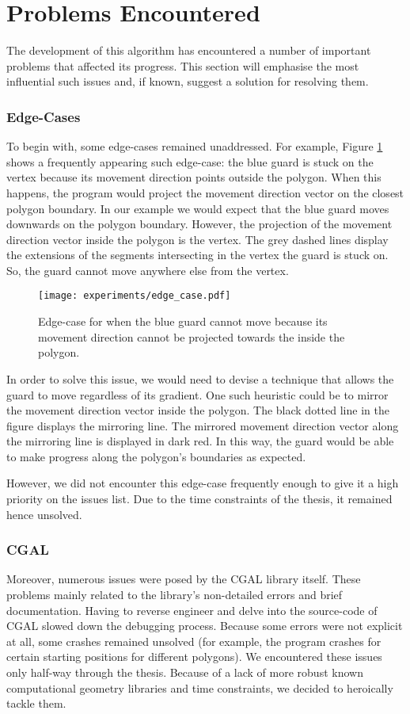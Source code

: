 \section{Problems Encountered}
\label{sec:problems}
The development of this algorithm has encountered a number of important problems that affected its progress. This section will emphasise the most influential such issues and, if known, suggest a solution for resolving them.

\subsubsection*{Edge-Cases}
To begin with, some edge-cases remained unaddressed. For example, Figure \ref{fig:edge} shows a frequently appearing such edge-case: the blue guard is stuck on the vertex because its movement direction points outside the polygon.
When this happens, the program would project the movement direction vector on the closest polygon boundary. In our example we would expect that the blue guard moves downwards on the polygon boundary. However, the projection of the movement direction vector inside the polygon is the vertex. The grey dashed lines display the extensions of the segments intersecting in the vertex the guard is stuck on. So, the guard cannot move anywhere else from the vertex.

\begin{figure}[h!]
    \centering
    \texttt{[image: experiments/edge\_case.pdf]}
    \caption{Edge-case for when the blue guard cannot move because its movement direction cannot be projected towards the inside the polygon.}
    \label{fig:edge}
\end{figure}

In order to solve this issue, we would need to devise a technique that allows the guard to move regardless of its gradient. One such heuristic could be to mirror the movement direction vector inside the polygon. The black dotted line in the figure displays the mirroring line. The mirrored movement direction vector along the mirroring line is displayed in dark red. In this way, the guard would be able to make progress along the polygon's boundaries as expected.

However, we did not encounter this edge-case frequently enough to give it a high priority on the issues list. Due to the time constraints of the thesis, it remained hence unsolved.

\subsubsection*{CGAL}
Moreover, numerous issues were posed by the CGAL library itself. These problems mainly related to the library's non-detailed errors and brief documentation. Having to reverse engineer and delve into the source-code of CGAL slowed down the debugging process. Because some errors were not explicit at all, some crashes remained unsolved (for example, the program crashes for certain starting positions for different polygons). We encountered these issues only half-way through the thesis. Because of a lack of more robust known computational geometry libraries and time constraints, we decided to heroically tackle them.

